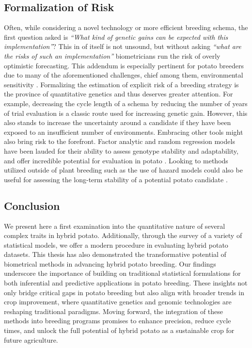 \documentclass[
]{article}
\begin{document}
\subsection{Formalization of Risk}\label{formalization-of-risk}

Often, while considering a novel technology or more efficient breeding
schema, the first question asked is \emph{``What kind of genetic gains
can be expected with this implementation''}? This in of itself is not
unsound, but without asking \emph{``what are the risks of such an
implementation''} biometricians run the risk of overly optimistic
forecasting. This addendum is especially pertinent for potato breeders
due to many of the aforementioned challenges, chief among them,
environmental sensitivity \autocite{George2017}. Formalizing the
estimation of explicit risk of a breeding strategy is the province of
quantitative genetics and thus deserves greater attention. For example,
decreasing the cycle length of a schema by reducing the number of years
of trial evaluation is a classic route used for increasing genetic gain.
However, this also stands to increase the uncertainty around a candidate
if they have been exposed to an insufficient number of environments.
Embracing other tools might also bring risk to the forefront. Factor
analytic and random regression models have been lauded for their ability
to assess genotype stability and adaptability, and offer incredible
potential for evaluation in potato \autocite{Souza2020,Smith2018}.
Looking to methods utilized outside of plant breeding such as the use of
hazard models could also be useful for assessing the long-term stability
of a potential potato candidate \autocite{Yazdi2002a}.

\subsection{Conclusion}\label{conclusion}

We present here a first examination into the quantitative nature of
several complex traits in hybrid potato. Additionally, through the
survey of a variety of statistical models, we offer a modern procedure
in evaluating hybrid potato datasets. This thesis has also demonstrated
the transformative potential of biometrical methods in advancing hybrid
potato breeding. Our findings underscore the importance of building on
traditional statistical formulations for both inferential and predictive
applications in potato breeding. These insights not only bridge critical
gaps in potato breeding but also align with broader trends in crop
improvement, where quantitative genetics and genomic technologies are
reshaping traditional paradigms. Moving forward, the integration of
these methods into breeding programs promises to enhance precision,
reduce cycle times, and unlock the full potential of hybrid potato as a
sustainable crop for future agriculture.


\printbibliography
\end{document}
